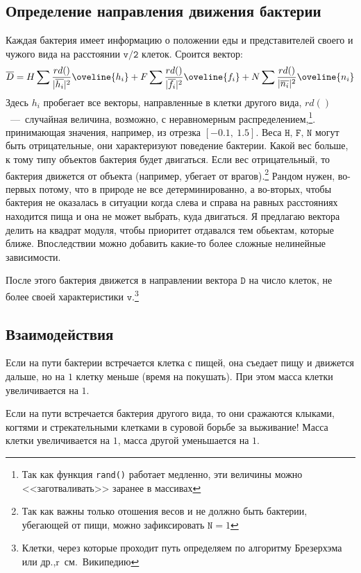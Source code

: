 \documentclass[11pt,twoside,twocolumn,russian,a4paper]{article}
\begin{document}
\subsection{Определение направления движения бактерии} \label{MV}
	Каждая бактерия имеет информацию о положении еды и представителей своего и чужого вида на расстоянии $\texttt{v/2}$ клеток. Сроится вектор:
	$$
		\overline{D} = H\sum{ \frac{rd()}{|\overline{h_i}|^2} \oveline{h_i}} +
			F\sum{ \frac{rd()}{|\overline{f_i}|^2} \oveline{f_i}} + 
			N\sum{ \frac{rd()}{|\overline{n_i}|^2} \oveline{n_i}}
	$$
	Здесь $h_i$ пробегает все векторы, направленные в клетки другого вида, $rd()$~---~случайная величина, возможно, с неравномерным распределением,\footnote{%
															Так как функция \texttt{rand()} работает медленно, эти величины можно 
															<<заготваливать>> заранее в массивах}.
	принимающая значения, например, из отрезка $[-0.1, \  1.5]$.
	Веса $\texttt{H, F, N}$ могут быть отрицательные, они характеризуют поведение бактерии. Какой вес больше, к тому типу объектов бактерия будет двигаться. 
	Если вес отрицательный, то бактерия движется от объекта (например, убегает от врагов).\footnote{%
												Так как важны только отошения весов и не должно быть бактерии, убегающей от пищи,
												 можно зафиксировать $\texttt{N} = 1$}
	Рандом нужен, во-первых потому, что в природе не все детерминированно, а во-вторых, чтобы бактерия не оказалась в ситуации
	когда слева и справа на равных расстояниях находится пища и она не может выбрать, куда двигаться. 
	Я предлагаю вектора делить на квадрат модуля, чтобы приоритет отдавался тем обьектам, которые ближе.
	Впоследствии можно добавить какие-то более сложные нелинейные зависимости.
	
	После этого бактерия движется в направлении вектора $\texttt{D}$ на число клеток, не более своей характеристики $\texttt{v}$.\footnote{%
									Клетки, через которые проходит путь определяем по алгоритму Брезерхэма или др.,r~см.~Википедию}
\subsection{Взаимодействия}
	Если на пути бактерии встречается клетка с пищей, она съедает пищу и движется дальше, но на $1$ клетку меньше (время на покушать). При этом масса клетки увеличивается на $1$.

	Если на пути встречается бактерия другого вида, то они сражаются клыками, когтями и стрекательными клетками в суровой борьбе за выживание! Масса клетки увеличивается на $1$,
		масса другой уменьшается на $1$.
\end{document}
